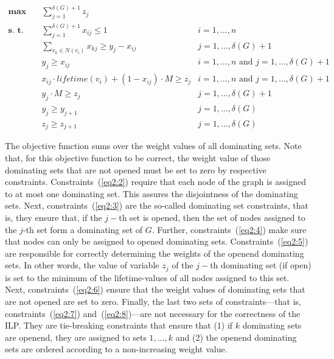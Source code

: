\documentclass[algorithms,article,accept,moreauthors,pdftex]{Definitions/mdpi}
\begin{document}
 \begin{align}
    \textbf{max}    \quad  & \sum_{j=1}^{\delta(G)+1} z_j \label{eq2:1} & \\ 
    \textbf{s.~t.}       \quad  & \sum_{j=1}^{\delta(G)+1} x_{ij}  \leq 1 & i = 1,\ldots,n \label{eq2:2} \\
                         \quad  & \sum_{v_k \in N(v_i)} x_{kj} \geq y_j - x_{ij}  & j = 1,\ldots,\delta(G)+1 \label{eq2:3}    \\
                         \quad  & y_j \geq x_{ij}                                 & i = 1,\ldots,n \mbox{ and } j = 1,\ldots,\delta(G)+1 \label{eq2:4} \\
                         \quad  & x_{ij} \cdot lifetime(v_i) + (1 - x_{ij}) \cdot M \geq z_j & i = 1,\ldots,n \mbox{ and } j = 1,\ldots,\delta(G)+1 \label{eq2:5} \\
                         \quad  & y_j \cdot M \geq z_j                       & j = 1, \ldots,\delta(G) + 1 \label{eq2:6} \\
                         \quad  & y_j \geq y_{j+1}                           & j = 1, \ldots,\delta(G) \label{eq2:7} \\
                         \quad  & z_j \geq z_{j+1}                           & j = 1, \ldots,\delta(G) \label{eq2:8}
\end{align}

The objective function sums over the weight values of all dominating sets. Note that, for this objective function to be correct, the weight value of those dominating sets that are not opened must be set to zero by respective constraints. Constraints~(\ref{eq2:2}) require that each node of the graph is assigned to at most one dominating set. This assures the disjointness of the dominating sets. Next, constraints~(\ref{eq2:3}) are the so-called dominating set constraints, that is, they ensure that, if the $j-$th set is opened, then the set of nodes assigned to the $j$-th set form a dominating set of $G$. Further, constraints~(\ref{eq2:4}) make sure that nodes can only be assigned to opened dominating sets. Constraints~(\ref{eq2:5}) are responsible for correctly determining the weights of the openend dominating sets. In other words, the value of variable $z_j$ of the $j-$th dominating set (if open) is set to the minimum of the lifetime-values of all nodes assigned to this set. Next, constraints~(\ref{eq2:6}) ensure that the weight values of dominating sets that are not opened are set to zero. Finally, the last two sets of constraints---that is, constraints~(\ref{eq2:7}) and~(\ref{eq2:8})---are not necessary for the correctness of the ILP. They are tie-breaking constraints that ensure that (1) if $k$ dominating sets are openend, they are assigned to sets $1,\ldots,k$ and (2) the openend dominating sets are ordered according to a non-increasing weight value.
\end{document}
